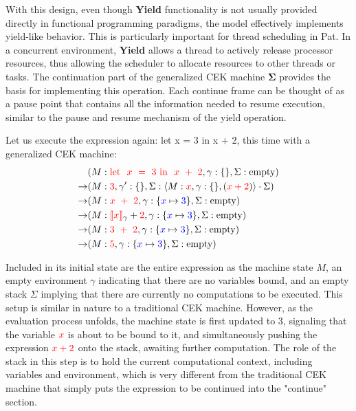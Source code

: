 \documentclass{l4proj}
\begin{document}
With this design, even though \textbf{Yield} functionality is not usually provided directly in functional programming paradigms, the model effectively implements yield-like behavior. This is particularly important for thread scheduling in Pat. In a concurrent environment, \textbf{Yield} allows a thread to actively release processor resources, thus allowing the scheduler to allocate resources to other threads or tasks. The continuation part of the generalized CEK machine $\boldsymbol{\Sigma}$ provides the basis for implementing this operation. Each continue frame can be thought of as a pause point that contains all the information needed to resume execution, similar to the pause and resume mechanism of the yield operation.

Let us execute the expression again: let x = 3 in x + 2, this time with a generalized CEK machine:
\begin{align*}
& (M: \textcolor{red}{\text{let } \ x\ =\ 3\ \text{in } \ x\ +\ 2}, \gamma: \{\}, \Sigma: \text{empty}) \\
\rightarrow & (M: \textcolor{red}{3}, \gamma': \{\}, \Sigma: \langle M: \textcolor{red}{x}, \gamma: \{\}, (\textcolor{red}{x+2})\rangle \cdot \Sigma) \\
\rightarrow & (M: \textcolor{red}{x\ +\ 2}, \gamma: \{ \textcolor{blue}{x} \mapsto \textcolor{blue}{3}\}, \Sigma: \text{empty}) \\
\rightarrow & (M: \textcolor{red}{\text{\textlbrackdbl} x \text{\textrbrackdbl}}_{\gamma} + \textcolor{red}{2}, \gamma: \{ \textcolor{blue}{x} \mapsto \textcolor{blue}{3}\}, \Sigma: \text{empty}) \\
\rightarrow & (M: \textcolor{red}{3\ +\ 2}, \gamma: \{ \textcolor{blue}{x} \mapsto \textcolor{blue}{3}\}, \Sigma: \text{empty}) \\
\rightarrow & (M: \textcolor{red}{5}, \gamma: \{ \textcolor{blue}{x} \mapsto \textcolor{blue}{3}\}, \Sigma: \text{empty})
\end{align*}

Included in its initial state are the entire expression as the machine state \(M\), an empty environment \(\gamma\) indicating that there are no variables bound, and an empty stack \(\Sigma\) implying that there are currently no computations to be executed. This setup is similar in nature to a traditional CEK machine. However, as the evaluation process unfolds, the machine state is first updated to {\color{red}3}, signaling that the variable $\color{red}x$ is about to be bound to it, and simultaneously pushing the expression $\color{red}x + 2$ onto the stack, awaiting further computation. The role of the stack in this step is to hold the current computational context, including variables and environment, which is very different from the traditional CEK machine that simply puts the expression to be continued into the "continue" section.
\end{document}

